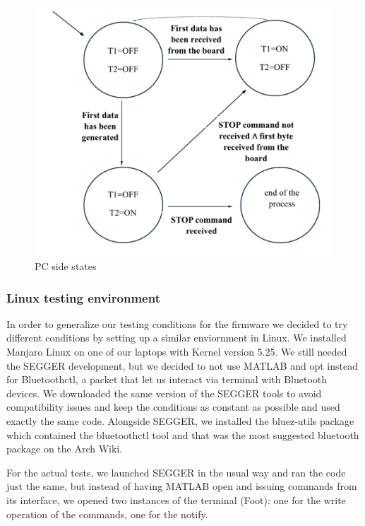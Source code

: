 \documentclass{Configuration_Files/PoliMi3i_thesis}
\begin{document}
\begin{figure}[H]
    \centering
    \includegraphics[scale=0.5]{Board Windows PC/11.png}
    \caption{PC side states}
    \label{fboardwindows_11}
\end{figure}

\subsubsection{Linux testing environment}

In order to generalize our testing conditions for the firmware we decided to try different conditions by setting up a similar enviornment in Linux.
We installed Manjaro Linux on one of our laptops with Kernel version 5.25.
We still needed the SEGGER development, but we decided to not use MATLAB and opt instead for Bluetoothctl, a packet that let us interact via terminal with Bluetooth devices.
We downloaded the same version of the SEGGER tools to avoid compatibility issues and keep the conditions as constant as possible and used exactly the same code.
Alongside SEGGER, we installed the bluez-utils package which contained the bluetoothctl tool and that was the most suggested bluetooth package on the Arch Wiki.

For the actual tests, we launched SEGGER in the usual way and ran the code just the same, but instead of having MATLAB open and issuing commands from its interface, we opened two instances of the terminal (Foot): one for the write operation of the commands, one for the notify.
\end{document}
